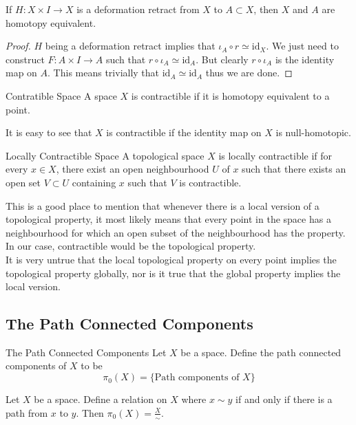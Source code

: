 \documentclass[a4paper]{article}
\begin{document}
\begin{lmm}{}{} If $H:X\times I\to X$ is a deformation retract from $X$ to $A\subset X$, then $X$ and $A$ are homotopy equivalent. 
\begin{proof}
$H$ being a deformation retract implies that $\iota_A\circ r\simeq\text{id}_X$. We just need to construct $F:A\times I\to A$ such that $r\circ\iota_A\simeq\text{id}_A$. But clearly $r\circ\iota_A$ is the identity map on $A$. This means trivially that $\text{id}_A\simeq\text{id}_A$ thus we are done. 
\end{proof}
\end{lmm}

\begin{defn}{Contratible Space}{} A space $X$ is contractible if it is homotopy equivalent to a point. 
\end{defn}

It is easy to see that $X$ is contractible if the identity map on $X$ is null-homotopic. 

\begin{defn}{Locally Contractible Space}{} A topological space $X$ is locally contractible if for every $x\in X$, there exist an open neighbourhood $U$ of $x$ such that there exists an open set $V\subset U$ containing $x$ such that $V$ is contractible. 
\end{defn}

This is a good place to mention that whenever there is a local version of a topological property, it most likely means that every point in the space has a neighbourhood for which an open subset of the neighbourhood has the property. In our case, contractible would be the topological property. \\

It is very untrue that the local topological property on every point implies the topological property globally, nor is it true that the global property implies the local version. 

\subsection{The Path Connected Components}
\begin{defn}{The Path Connected Components}{} Let $X$ be a space. Define the path connected components of $X$ to be $$\pi_0(X)=\{\text{Path components of }X\}$$
\end{defn}

\begin{prp}{}{} Let $X$ be a space. Define a relation on $X$ where $x\sim y$ if and only if there is a path from $x$ to $y$. Then $\pi_0(X)=\frac{X}{\sim}$. 
\end{prp}
\end{document}
